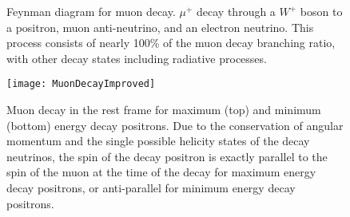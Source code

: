 \begin{figure}
\centering
\caption[Feynman diagram for muon decay]{Feynman diagram for muon decay. $\mu^{+}$ decay through a $W^{+}$ boson to a positron, muon anti-neutrino, and an electron neutrino. This process consists of nearly 100\% of the muon decay branching ratio, with other decay states including radiative processes.}
\label{fig:mudecay}
\end{figure}



\begin{figure}
    \centering
    \texttt{[image: MuonDecayImproved]}
    \caption[Muon decay for maximum and minimum energy decay positrons]{Muon decay in the rest frame for maximum (top) and minimum (bottom) energy decay positrons. Due to the conservation of angular momentum and the single possible helicity states of the decay neutrinos, the spin of the decay positron is exactly parallel to the spin of the muon at the time of the decay for maximum energy decay positrons, or anti-parallel for minimum energy decay positrons.}
    \label{fig:MuonDecayImproved}
\end{figure}


